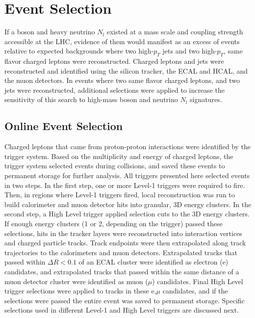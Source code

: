 \chapter{Event Selection}
\label{sec:event_selection_chapter}

If a \WR boson and heavy neutrino $N_{l}$ existed at a mass scale and coupling strength accessible 
at the LHC, evidence of them would manifest as an excess of events relative to expected backgrounds 
where two high-$p_{T}$ jets and two high-$p_{T}$, same flavor charged leptons were reconstructed.  
Charged leptons and jets were reconstructed and identified using the silicon tracker, the ECAL and 
HCAL, and the muon detectors.  In events where two same flavor charged leptons, and two jets were 
reconstructed, additional selections were applied to increase the sensitivity of this search to 
high-mass \WR boson and neutrino $N_{l}$ signatures.

\section{Online Event Selection}
\label{sec:triggers}
Charged leptons that came from proton-proton interactions were identified by the trigger system.  Based 
on the multiplicity and energy of charged leptons, the trigger system selected events during 
collisions, and saved these events to permanent storage for further analysis.  All triggers presented 
here selected events in two steps.  In the first step, one or more Level-1 triggers were 
required to fire.  Then, in regions where Level-1 triggers fired, local reconstruction was run to 
build calorimeter and muon detector hits into granular, 3D energy clusters.  In the second step, 
a High Level trigger applied selection cuts to the 3D energy clusters.  If 
enough energy clusters (1 or 2, depending on the trigger) passed these selections, hits in the tracker 
layers were reconstructed into interaction vertices and charged particle tracks.  Track endpoints 
were then extrapolated along track trajectories to the calorimeters and muon detectors.  Extrapolated 
tracks that passed within $\Delta R < 0.1$ of an ECAL cluster were identified as electron (e) 
candidates, and extrapolated tracks that passed within the same distance of a muon detector cluster 
were identified as muon ($\mu$) candidates.  Final High Level trigger selections were applied to 
tracks in these e,$\mu$ candidates, and if the selections were passed the entire event was saved 
to permanent storage.  Specific selections used in different Level-1 and High Level triggers are 
discussed next.


